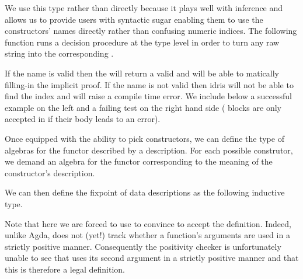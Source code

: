 
We use this type rather than  directly because it
plays well with inference and allows us to provide users with
syntactic sugar enabling them to use the constructors' names
directly rather than confusing numeric indices.
%
The following function runs a decision procedure
 at the type level
in order to turn any raw string 
into the corresponding .


If the name is valid then the  will
return a valid  and \idris{} will be able to
matically filling-in the implicit proof.
%
If the name is not valid then idris will not be able to
find the index and will raise a compile time error.
%
We include below a successful example on the left and a failing test
on the right hand side ( blocks are only
accepted in \idris{} if their body leads to an error).

\begin{minipage}[t]{0.3\textwidth}
\end{minipage}\hfill
\begin{minipage}[t]{0.5\textwidth}
\end{minipage}

Once equipped with the ability to pick constructors, we can define
the type of algebras for the functor described by a 
description. For each possible construtor, we demand an algebra for
the functor corresponding to the meaning of the  constructor's description.


We can then define the fixpoint of data descriptions as the following
inductive type.



Note that here we are forced to use \assertTotal{} to convince \idris{}
to accept the definition.
%
Indeed, unlike Agda, \idris{} does not (yet!) track whether a function's
arguments are used in a strictly positive manner.
%
Consequently the positivity checker
is unfortunately unable to see that  uses its second
argument in a strictly positive manner
and that this is therefore a legal definition.

